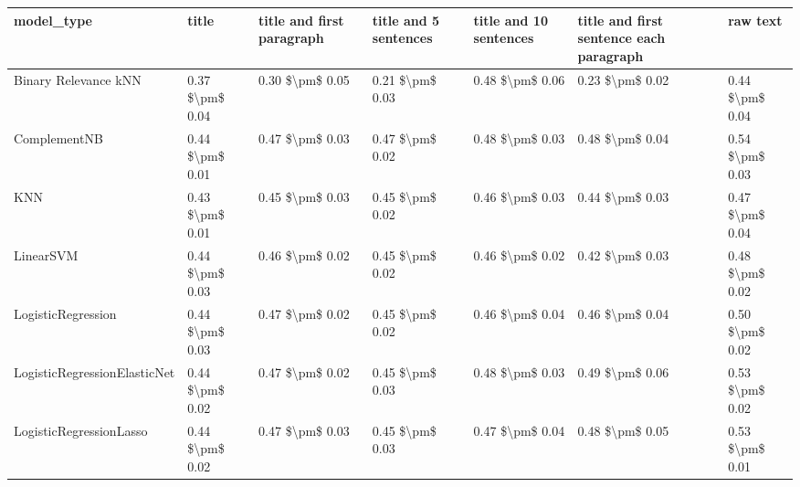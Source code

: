 \begin{tabular}{lllllll}
\toprule
                     model\_type &           title & title and first paragraph & title and 5 sentences & title and 10 sentences & title and first sentence each paragraph &            raw text \\
\midrule
           Binary Relevance kNN & 0.37 \$\textbackslash pm\$ 0.04 &           0.30 \$\textbackslash pm\$ 0.05 &       0.21 \$\textbackslash pm\$ 0.03 &        0.48 \$\textbackslash pm\$ 0.06 &                         0.23 \$\textbackslash pm\$ 0.02 &     0.44 \$\textbackslash pm\$ 0.04 \\
                   ComplementNB & 0.44 \$\textbackslash pm\$ 0.01 &           0.47 \$\textbackslash pm\$ 0.03 &       0.47 \$\textbackslash pm\$ 0.02 &        0.48 \$\textbackslash pm\$ 0.03 &                         0.48 \$\textbackslash pm\$ 0.04 &     0.54 \$\textbackslash pm\$ 0.03 \\
                            KNN & 0.43 \$\textbackslash pm\$ 0.01 &           0.45 \$\textbackslash pm\$ 0.03 &       0.45 \$\textbackslash pm\$ 0.02 &        0.46 \$\textbackslash pm\$ 0.03 &                         0.44 \$\textbackslash pm\$ 0.03 &     0.47 \$\textbackslash pm\$ 0.04 \\
                      LinearSVM & 0.44 \$\textbackslash pm\$ 0.03 &           0.46 \$\textbackslash pm\$ 0.02 &       0.45 \$\textbackslash pm\$ 0.02 &        0.46 \$\textbackslash pm\$ 0.02 &                         0.42 \$\textbackslash pm\$ 0.03 &     0.48 \$\textbackslash pm\$ 0.02 \\
             LogisticRegression & 0.44 \$\textbackslash pm\$ 0.03 &           0.47 \$\textbackslash pm\$ 0.02 &       0.45 \$\textbackslash pm\$ 0.02 &        0.46 \$\textbackslash pm\$ 0.04 &                         0.46 \$\textbackslash pm\$ 0.04 &     0.50 \$\textbackslash pm\$ 0.02 \\
   LogisticRegressionElasticNet & 0.44 \$\textbackslash pm\$ 0.02 &           0.47 \$\textbackslash pm\$ 0.02 &       0.45 \$\textbackslash pm\$ 0.03 &        0.48 \$\textbackslash pm\$ 0.03 &                         0.49 \$\textbackslash pm\$ 0.06 &     0.53 \$\textbackslash pm\$ 0.02 \\
        LogisticRegressionLasso & 0.44 \$\textbackslash pm\$ 0.02 &           0.47 \$\textbackslash pm\$ 0.03 &       0.45 \$\textbackslash pm\$ 0.03 &        0.47 \$\textbackslash pm\$ 0.04 &                         0.48 \$\textbackslash pm\$ 0.05 &     0.53 \$\textbackslash pm\$ 0.01 \\

\end{tabular}
